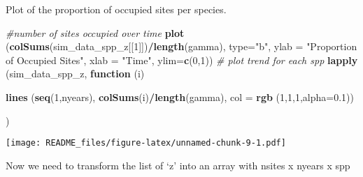 \documentclass[
]{article}
\newenvironment{Shaded}{\begin{snugshade}}{\end{snugshade}}
\newcommand{\AttributeTok}[1]{\textcolor[rgb]{0.13,0.29,0.53}{#1}}
\newcommand{\CommentTok}[1]{\textcolor[rgb]{0.56,0.35,0.01}{\textit{#1}}}
\newcommand{\ControlFlowTok}[1]{\textcolor[rgb]{0.13,0.29,0.53}{\textbf{#1}}}
\newcommand{\DecValTok}[1]{\textcolor[rgb]{0.00,0.00,0.81}{#1}}
\newcommand{\FloatTok}[1]{\textcolor[rgb]{0.00,0.00,0.81}{#1}}
\newcommand{\FunctionTok}[1]{\textcolor[rgb]{0.13,0.29,0.53}{\textbf{#1}}}
\newcommand{\NormalTok}[1]{#1}
\newcommand{\SpecialCharTok}[1]{\textcolor[rgb]{0.81,0.36,0.00}{\textbf{#1}}}
\newcommand{\StringTok}[1]{\textcolor[rgb]{0.31,0.60,0.02}{#1}}
\begin{document}
Plot of the proportion of occupied sites per species.

\begin{Shaded}
\begin{Highlighting}[]
\CommentTok{\#number of sites occupied over time}
\FunctionTok{plot}\NormalTok{ (}\FunctionTok{colSums}\NormalTok{(sim\_data\_spp\_z[[}\DecValTok{1}\NormalTok{]])}\SpecialCharTok{/}\FunctionTok{length}\NormalTok{(gamma), }\AttributeTok{type=}\StringTok{"b"}\NormalTok{, }
      \AttributeTok{ylab =} \StringTok{"Proportion of Occupied Sites"}\NormalTok{, }\AttributeTok{xlab =} \StringTok{"Time"}\NormalTok{,}
      \AttributeTok{ylim=}\FunctionTok{c}\NormalTok{(}\DecValTok{0}\NormalTok{,}\DecValTok{1}\NormalTok{))}
\CommentTok{\# plot trend for each spp}
\FunctionTok{lapply}\NormalTok{ (sim\_data\_spp\_z, }\ControlFlowTok{function}\NormalTok{ (i)}

  \FunctionTok{lines}\NormalTok{ (}\FunctionTok{seq}\NormalTok{(}\DecValTok{1}\NormalTok{,nyears),}
        \FunctionTok{colSums}\NormalTok{(i)}\SpecialCharTok{/}\FunctionTok{length}\NormalTok{(gamma),}
  \AttributeTok{col =} \FunctionTok{rgb}\NormalTok{ (}\DecValTok{1}\NormalTok{,}\DecValTok{1}\NormalTok{,}\DecValTok{1}\NormalTok{,}\AttributeTok{alpha=}\FloatTok{0.1}\NormalTok{))}
  
\NormalTok{)}
\end{Highlighting}
\end{Shaded}

\texttt{[image: README\_files/figure-latex/unnamed-chunk-9-1.pdf]}

Now we need to transform the list of `z' into an array with nsites x
nyears x spp
\end{document}
